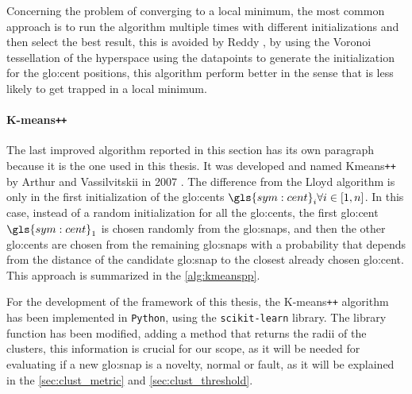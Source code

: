 Concerning the problem of converging to a local minimum, the most common approach is to run the algorithm multiple times with different initializations and then select the best result, this is avoided by Reddy \cite{Vornoi_Kmeans}, by using the Voronoi tessellation of the hyperspace using the datapoints to generate the initialization for the {\gls{glo:cent}} positions, this algorithm perform better in the sense that is less likely to get trapped in a local minimum.


\paragraph{K-means\texttt{++}} 
The last improved algorithm reported in this section has its own paragraph because it is the one used in this thesis. It was developed and named Kmeans\texttt{++} by Arthur and Vassilvitskii in 2007 \cite{Kmeanspp}. The difference from the Lloyd algorithm is only in the first initialization of the {\gls{glo:cent}}s $\gls{sym:cent}_i \forall i \in [1,n]$. In this case, instead of a random initialization for all the {\gls{glo:cent}}s, the first {\gls{glo:cent}} $\gls{sym:cent}_1$ is chosen randomly from the {\gls{glo:snap}}s, and then the other {\gls{glo:cent}}s are chosen from the remaining {\gls{glo:snap}}s with a probability that depends from the distance of the candidate {\gls{glo:snap}} to the closest already chosen {\gls{glo:cent}}. This approach is summarized in the \autoref{alg:kmeanspp}.

For the development of the framework of this thesis, the K-means\texttt{++} algorithm has been implemented in \texttt{Python}, using the \texttt{scikit-learn} library. The library function has been modified, adding a method that returns the radii of the clusters, this information is crucial for our scope, as it will be needed for evaluating if a new {\gls{glo:snap}} is a novelty, normal or fault, as it will be explained in the \autoref{sec:clust_metric} and \autoref{sec:clust_threshold}.

